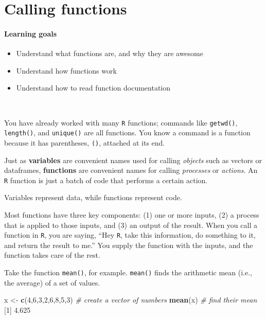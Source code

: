 \documentclass[
]{book}
\newenvironment{Shaded}{\begin{snugshade}}{\end{snugshade}}
\newcommand{\CommentTok}[1]{\textcolor[rgb]{0.56,0.35,0.01}{\textit{#1}}}
\newcommand{\DecValTok}[1]{\textcolor[rgb]{0.00,0.00,0.81}{#1}}
\newcommand{\FloatTok}[1]{\textcolor[rgb]{0.00,0.00,0.81}{#1}}
\newcommand{\FunctionTok}[1]{\textcolor[rgb]{0.13,0.29,0.53}{\textbf{#1}}}
\newcommand{\NormalTok}[1]{#1}
\newcommand{\OtherTok}[1]{\textcolor[rgb]{0.56,0.35,0.01}{#1}}
\providecommand{\tightlist}{%
  \setlength{\itemsep}{0pt}\setlength{\parskip}{0pt}}
\begin{document}
\chapter{Calling functions}\label{calling_functions}

\subsubsection*{Learning goals}\label{learning-goals-5}

\begin{itemize}
\tightlist
\item
  Understand what functions are, and why they are awesome
\item
  Understand how functions work
\item
  Understand how to read function documentation
\end{itemize}

~

You have already worked with many \texttt{R} functions; commands like \texttt{getwd()}, \texttt{length()}, and \texttt{unique()} are all functions. You know a command is a function because it has parentheses, \texttt{()}, attached at its end.

Just as \textbf{variables} are convenient names used for calling \emph{objects} such as vectors or dataframes, \textbf{functions} are convenient names for calling \emph{processes} or \emph{actions}. An \texttt{R} function is just a batch of code that performs a certain action.

Variables represent data, while functions represent code.

Most functions have three key components: (1) one or more inputs, (2) a process that is applied to those inputs, and (3) an output of the result. When you call a function in \texttt{R}, you are saying, ``Hey \texttt{R}, take this information, do something to it, and return the result to me.'' You supply the function with the inputs, and the function takes care of the rest.

Take the function \texttt{mean()}, for example. \texttt{mean()} finds the arithmetic mean (i.e., the average) of a set of values.

\begin{Shaded}
\begin{Highlighting}[]
\NormalTok{x }\OtherTok{\textless{}{-}} \FunctionTok{c}\NormalTok{(}\DecValTok{4}\NormalTok{,}\DecValTok{6}\NormalTok{,}\DecValTok{3}\NormalTok{,}\DecValTok{2}\NormalTok{,}\DecValTok{6}\NormalTok{,}\DecValTok{8}\NormalTok{,}\DecValTok{5}\NormalTok{,}\DecValTok{3}\NormalTok{) }\CommentTok{\# create a vector of numbers}
\FunctionTok{mean}\NormalTok{(x) }\CommentTok{\# find their mean}
\NormalTok{[}\DecValTok{1}\NormalTok{] }\FloatTok{4.625}
\end{Highlighting}
\end{Shaded}
\end{document}
